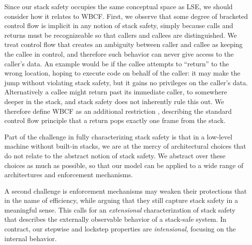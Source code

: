 \documentclass[acmsmall,review,anonymous]{acmart}\settopmatter{printfolios=true,printccs=false,printacmref=false}
\begin{document}
Since our stack safety occupies the same conceptual space as LSE, we should consider how it
relates to WBCF.
First, we observe that some degree of bracketed control flow is implicit
in any notion of stack safety, simply because calls and returns must be recognizeable so
that callers and callees are distinguished. We treat control flow that creates an ambiguity between caller and
callee  as keeping the callee in control, and therefore such behavior can never give access
to the caller's data. An example would be if the callee attempts to ``return'' to the
wrong location, hoping to execute code on behalf of the caller: it may make the jump
without violating stack safety, but it gains no privileges on the caller's data.
Alternatively a callee might return past its immediate caller, to somewhere deeper in the
stack, and stack safety does not inherently rule this out. We therefore define WBCF as an additional
restriction ,
describing the standard control flow principle that a return pops exactly one frame
from the stack.

Part of the challenge in fully characterizing stack safety is that in a low-level machine
without built-in stacks, we are at the mercy of architectural
choices that do not relate to the abstract notion of stack safety.
We abstract over these choices
as much as possible, so that our model can be applied to a wide range of architectures
and enforcement mechanisms.

A second challenge is
enforcement mechanisms may weaken their protections that in the name of efficiency,
while arguing that they still capture stack safety in a meaningful sense.
This calls 
for an {\em extensional}
characterization of stack safety that describes the externally observable behavior
of a stack-safe system. In contract, our stepwise and lockstep properties are {\em intensional},
focusing on the internal behavior.
\end{document}
